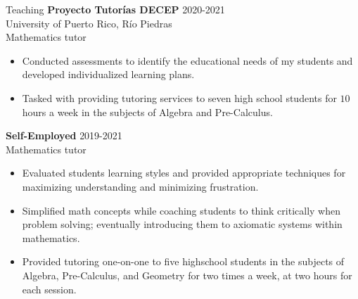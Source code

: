 \documentclass{resume}
\begin{document}
\begin{rSection}{Teaching}
  \textbf{Proyecto Tutor\'ias DECEP} \hfill{2020-2021} \\
  University of Puerto Rico, R\'io Piedras \\
  Mathematics tutor
  \begin{itemize}
    \item[] Conducted assessments to identify the educational needs of my
      students and developed individualized learning plans.

    \item[] Tasked with providing tutoring services to seven high school
      students for $10$ hours a week in the subjects of Algebra and
      Pre-Calculus.
  \end{itemize}

  \textbf{Self-Employed} \hfill{2019-2021} \\
  Mathematics tutor

  \begin{itemize}
    \item[] Evaluated students learning styles and provided appropriate
      techniques for maximizing understanding and minimizing frustration.

    \item[] Simplified math concepts while coaching students to think
      critically when problem solving; eventually introducing them to
      axiomatic systems within mathematics.

    \item[] Provided tutoring one-on-one to five highschool students in the
      subjects of Algebra, Pre-Calculus, and Geometry for two times a
      week, at two hours for each session.
  \end{itemize}
\end{rSection}
\end{document}
